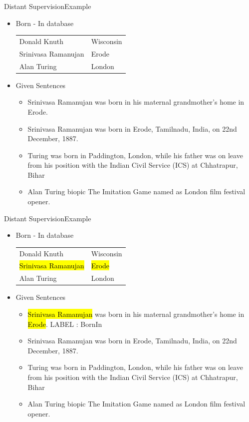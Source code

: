 \documentclass{beamer}
\makeatletter
\newcommand\SoulColor{%
  \let\set@color\beamerorig@set@color
  \let\reset@color\beamerorig@reset@color}
\makeatother
\begin{document}
\begin{frame}{Distant Supervision}{Example}
\begin{itemize}
 
\item Born - In database
 \begin{center}
\begin{tabular}{|l|l|}
\hline
Donald Knuth & Wisconsin \\
Srinivasa Ramanujan & Erode \\
Alan Turing & London \\
\hline
\end{tabular}
\end{center}
\item Given Sentences
\begin{itemize}
\item Srinivasa Ramanujan was born in his maternal grandmother’s home in Erode.
\item Srinivasa Ramanujan was born in Erode, Tamilnadu, India, on 22nd December, 1887.
\item Turing was born in Paddington, London, while his father was on leave from his position with the Indian Civil Service (ICS) at Chhatrapur, Bihar
\item Alan Turing biopic The Imitation Game named as London film festival opener.
\end{itemize}
\end{itemize}
 
\end{frame}
\begin{frame}{Distant Supervision}{Example}
\begin{itemize}
 
\item Born - In database
 \begin{center}
\begin{tabular}{|l|l|}
\hline
Donald Knuth & Wisconsin \\
\SoulColor\hl{Srinivasa Ramanujan} & \SoulColor\hl{Erode} \\
Alan Turing & London \\
\hline
\end{tabular}
\end{center}
\item Given Sentences
\begin{itemize}
\item \alert<+> {\SoulColor\hl{Srinivasa Ramanujan} was born in his maternal grandmother’s home in \SoulColor\hl{Erode}.} \alert{LABEL : BornIn}
\item Srinivasa Ramanujan was born in Erode, Tamilnadu, India, on 22nd December, 1887.
\item Turing was born in Paddington, London, while his father was on leave from his position with the Indian Civil Service (ICS) at Chhatrapur, Bihar
\item Alan Turing biopic The Imitation Game named as London film festival opener.
\end{itemize}
\end{itemize}
 
\end{frame}
\end{document}
